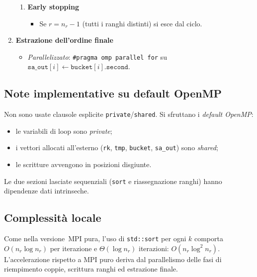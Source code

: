 \begin{enumerate}
\begin{enumerate}
				\item \textbf{Early stopping}
				\begin{itemize}
					\item Se \(r = n_r-1\) (tutti i ranghi distinti) si esce dal ciclo.
				\end{itemize}
			\end{enumerate}
			
			\item \textbf{Estrazione dell'ordine finale}
			\begin{itemize}
				\item \emph{Parallelizzato}: \texttt{\#pragma omp parallel for} su \(\texttt{sa\_out}[i] \leftarrow \texttt{bucket}[i].\texttt{second}\).
			\end{itemize}
		\end{enumerate}
		
		\subsection*{Note implementative su default OpenMP}
			Non sono usate clausole esplicite \texttt{private}/\texttt{shared}.
			Si sfruttano i \emph{default OpenMP}:
			\begin{itemize}
				\item le variabili di loop sono \emph{private};
				\item i vettori allocati all'esterno (\texttt{rk}, \texttt{tmp}, \texttt{bucket}, \texttt{sa\_out}) sono \emph{shared};
				\item le scritture avvengono in posizioni disgiunte.
			\end{itemize}
			
			Le due sezioni lasciate sequenziali (\texttt{sort} e riassegnazione ranghi) hanno dipendenze dati intrinseche.
		
		\subsection*{Complessità locale}
			Come nella versione~MPI pura, l'uso di \texttt{std::sort} per ogni \(k\) comporta \(O(n_r \log n_r)\) per iterazione e \(\Theta(\log n_r)\) iterazioni: \(O(n_r \log^2 n_r)\).
			L’accelerazione rispetto a MPI puro deriva dal parallelismo delle fasi di riempimento coppie, scrittura ranghi ed estrazione finale.
	
